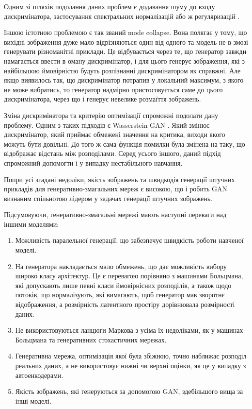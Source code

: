 Одним зі шляхів подолання даних проблем є додавання шуму до
входу дискримінатора, застосування спектральних нормалізацій \cite{miyato2018spectral} або
ж регуляризацій \cite{roth2017stabilizing}.

Іншою істотною проблемою є так званий mode collapse.
Вона полягає у тому, що вихідні зображення дуже мало
відрізняються один від одного та модель не в змозі генерувати
різноманітні приклади. Це відбувається через те, що генератор
завжди намагається ввести в оману дискримінатор, і для цього
генерує зображення, які з найбільшою ймовірністю будуть розпізнанні
дискримінатором як справжні. Але якщо виявилось так, що
дискримінатор потрапив у локальний максимум, з якого не може вибратись,
то генератор надмірно пристосовується саме до цього дискримінатора, через
що і генерує невелике розмаїття зображень.

Зміна дискримінатора та критерію оптимізації спроможні подолати
дану проблему. Одним з таких підходів є Wasserstein GAN \cite{arjovsky2017wasserstein}.
Який змінює дискримінатор, який приймає обмежені значення на критика,
виходи якого можуть бути довільні. До того ж сама функція помилки
була змінена на таку, що відображає відстань між розподілами.
Серед усього іншого, даний підхід спроможний допомогти і
у випадку нестабільного навчання.

Попри усі згадані недоліки, якість зображень та швидкодія генерації
штучних прикладів для генеративно-змагальних мереж є
високою, що і робить GAN визнаним спільнотою лідером у задачах
генерації штучних зображень.

Підсумовуючи, генеративно-змагальні мережі мають наступні
переваги над іншими моделями:
\begin{enumerate}
    \item Можливість паралельної генерації,
          що забезпечує швидкість роботи навченої моделі.
    \item На генератора накладається мало обмежень, що дає можливість
          вибору широко класу архітектур.
          Це є перевагою порівняно з машинами Больцмана,
          які допускають лише певні класи  ймовірнісних розподілів,
          а також щодо потоків, що нормалізують, які вимагають, щоб генератор
          мав зворотнє відображення, а розмірність латентного простіру
          дорівнювала розмірності даних.
    \item Не використовуються ланцюги Маркова з усіма їх
          недоліками, як у машинах Больцмана та генеративних стохастичних мережах.
    \item Генеративна мережа, оптимізація якої була збіжною, точно наближає
          розподіл реальних даних, а не використовує нижні чи верхні
          оцінки, як це у випадку з автоенкодерами.
    \item Якість зображень, які генеруються за допомогою GAN,
          здебільшого вища за інші моделі.
\end{enumerate}

